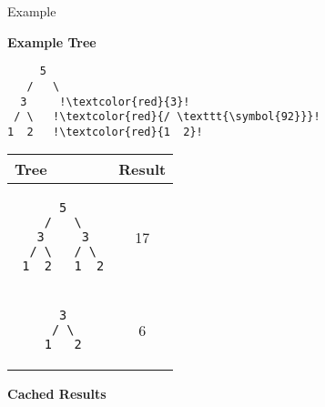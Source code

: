 \begin{slide}{Example}
\begin{minipage}{.3\textwidth}
\begin{center}
\textbf{Example Tree}

\vspace*{0.4cm}
\begin{verbatim}
     5 
   /   \
  3     !\textcolor{red}{3}!
 / \   !\textcolor{red}{/ \texttt{\symbol{92}}}!
1  2   !\textcolor{red}{1  2}!
\end{verbatim}
\end{center}
\end{minipage}
\hfill
\begin{minipage}{.6\textwidth}
\begin{center}
\begin{tabular}{ | p{} | c | }
\hline
\textbf{Tree} & \textbf{Result} \\ 
\hline
\vspace{0.1em}
\begin{minipage}[t]{.2\textwidth}
\begin{verbatim}
      5 
    /   \
   3     3
  / \   / \
 1  2   1  2
\end{verbatim}
\end{minipage}
\vspace{0.5em} & 17 \\
\hline
\vspace{0.1em}
\begin{minipage}[t]{.2\textwidth}
\begin{verbatim}
      3 
     / \ 
    1   2
\end{verbatim}
\end{minipage}
\vspace{0.5em}  & 6 \\
\hline
\end{tabular}
\vspace*{0.7cm}

\textbf{Cached Results}
\end{center}
\end{minipage}

\end{slide}